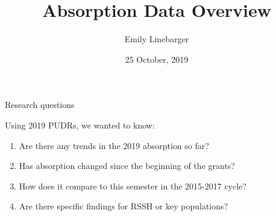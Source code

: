 \documentclass[ignorenonframetext,]{beamer}
\title{Absorption Data Overview}
\author{Emily Linebarger}
\date{25 October, 2019}
\providecommand{\tightlist}{%
  \setlength{\itemsep}{0pt}\setlength{\parskip}{0pt}}
\begin{document}
\frame{\titlepage}

\begin{frame}{Research questions}
\protect\hypertarget{research-questions}{}

Using 2019 PUDRs, we wanted to know:

\begin{enumerate}
\tightlist
\item
  Are there any trends in the 2019 absorption so far?
\item
  Has absorption changed since the beginning of the grants?
\item
  How does it compare to this semester in the 2015-2017 cycle?
\item
  Are there specific findings for RSSH or key populations?
\end{enumerate}

\end{frame}
\end{document}
